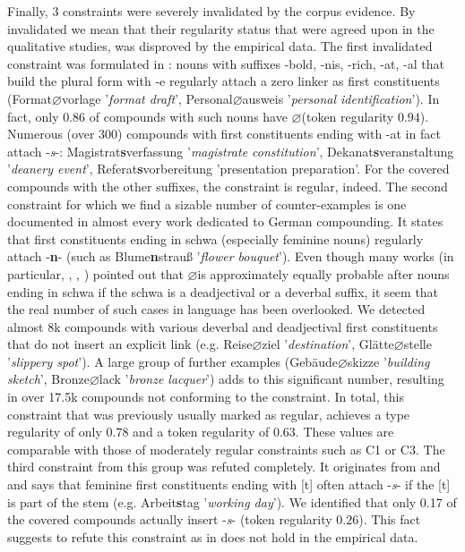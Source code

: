 \documentclass[10pt, a4paper]{article}
\newcommand{\zeroLinker}{\ensuremath{\boldsymbol{\varnothing}}}
\begin{document}
Finally, 3 constraints were severely invalidated by the corpus evidence. By invalidated we mean that their regularity status that were agreed upon in the qualitative studies, was disproved by the empirical data. The first invalidated constraint was formulated in \citet[107]{ortner_mueller-bollhagen_1991}: nouns with suffixes -bold, -nis, -rich, -at, -al that build the plural form with -e regularly attach a zero linker as first constituents (Format{\zeroLinker}vorlage '\textit{format draft}', Personal{\zeroLinker}ausweis '\textit{personal identification}'). In fact, only 0.86 of compounds with such nouns have \zeroLinker (token regularity $0.94$). Numerous (over 300) compounds with first constituents ending with -at in fact attach -\textit{s}-: Magistrat\textbf{s}verfassung '\textit{magistrate constitution}', Dekanat\textbf{s}veranstaltung '\textit{deanery event}', Referat\textbf{s}vorbereitung 'presentation preparation'. For the covered compounds with the other suffixes, the constraint is regular, indeed. The second constraint for which we find a sizable number of counter-examples is one documented in almost every work dedicated to German compounding. It states that first constituents ending in schwa (especially feminine nouns) regularly attach -\textbf{n}- (such as Blume\textbf{n}strauß '\textit{flower bouquet}'). Even though many works (in particular, \citealp[573]{fuhrhop_kuerschner_2015}, \citealp[112]{kuerschner_2005}, \citealp[93]{ortner_mueller-bollhagen_1991}) pointed out that \zeroLinker is approximately equally probable after nouns ending in schwa if the schwa is a deadjectival or a deverbal suffix, it seem that the real number of such cases in language has been overlooked. We detected almost 8k compounds with various deverbal and deadjectival first constituents that do not insert an explicit link (e.g. Reise{\zeroLinker}ziel '\textit{destination}', Glätte{\zeroLinker}stelle '\textit{slippery spot}'). A large group of further examples (Gebäude{\zeroLinker}skizze '\textit{building sketch}', Bronze{\zeroLinker}lack '\textit{bronze lacquer}') adds to this significant number, resulting in over 17.5k compounds not conforming to the constraint. In total, this constraint that was previously usually marked as regular, achieves a type regularity of only $0.78$ and a token regularity of $0.63$. These values are comparable with those of moderately regular constraints such as C1 or C3. The third constraint from this group was refuted completely. It originates from \citet[77]{nuebling_szczepaniak_2013} and \citet[74, 75]{ortner_mueller-bollhagen_1991} and says that feminine first constituents ending with [t] often attach -\textit{s}- if the [t] is part of the stem (e.g. Arbeit\textbf{s}tag '\textit{working day}'). We identified that only 0.17 of the covered compounds actually insert -\textit{s}- (token regularity $0.26$). This fact suggests to refute this constraint as in does not hold in the empirical data.
\end{document}
